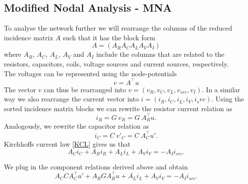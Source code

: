 	\subsection{Modified Nodal Analysis - MNA}
	\begin{frame}
		To analyse the network further we will rearrange the columns of the reduced incidence matrix $A$ such that it has the block form
		\begin{displaymath}
			A = (A_R A_C A_L A_V A_I)
		\end{displaymath}
		where $A_R$, $A_C$, $A_L$, $A_V$ and $A_I$ include the columns that are related to the resistors, capacitors, coils, voltage sources and current sources, respectively.\\
		The voltages can be represented using the node-potentials
		\begin{displaymath}
			v = A^\top u
		\end{displaymath}
		The vector $v$ can thus be rearranged into $v = (v_R, v_C, v_L, v_{src}, v_I)$. In a similar way we also rearrange the current vector into $i = (i_R, i_C, i_L, i_V, i_src)$. Using the sorted incidence matrix blocks we can rewrite the resistor current relation as
		\begin{displaymath}
			i_R = G \ v_R = G \ A_R^\top u.
		\end{displaymath}
		Analogously, we rewrite the capacitor relation as
		\begin{displaymath}
			i_C = C \ v'_C = C \ A_C^\top u'.
		\end{displaymath}
		Kirchhoffs current law \eqref{KCL} gives us that
		\begin{displaymath}
			A_C i_C + A_R i_R + A_L i_L + A_V i_V = -A_I i_{src}.
		\end{displaymath}
		
		We plug in the component relations derived above and obtain
		\begin{displaymath}
			A_C C A_C^\top u' + A_R G A_R^\top u + A_L i_L + A_V i_V = -A_I i_{src}.
		\end{displaymath}
	\end{frame}

